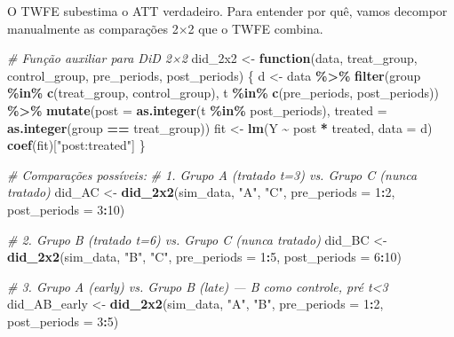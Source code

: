 \documentclass[
]{article}
\newenvironment{Shaded}{\begin{snugshade}}{\end{snugshade}}
\newcommand{\AttributeTok}[1]{\textcolor[rgb]{0.13,0.29,0.53}{#1}}
\newcommand{\CommentTok}[1]{\textcolor[rgb]{0.56,0.35,0.01}{\textit{#1}}}
\newcommand{\ControlFlowTok}[1]{\textcolor[rgb]{0.13,0.29,0.53}{\textbf{#1}}}
\newcommand{\DecValTok}[1]{\textcolor[rgb]{0.00,0.00,0.81}{#1}}
\newcommand{\FunctionTok}[1]{\textcolor[rgb]{0.13,0.29,0.53}{\textbf{#1}}}
\newcommand{\NormalTok}[1]{#1}
\newcommand{\OtherTok}[1]{\textcolor[rgb]{0.56,0.35,0.01}{#1}}
\newcommand{\SpecialCharTok}[1]{\textcolor[rgb]{0.81,0.36,0.00}{\textbf{#1}}}
\newcommand{\StringTok}[1]{\textcolor[rgb]{0.31,0.60,0.02}{#1}}
\begin{document}
O TWFE subestima o ATT verdadeiro. Para entender por quê, vamos decompor manualmente as comparações 2×2 que o TWFE combina.

\begin{Shaded}
\begin{Highlighting}[]
\CommentTok{\# Função auxiliar para DiD 2×2}
\NormalTok{did\_2x2 }\OtherTok{\textless{}{-}} \ControlFlowTok{function}\NormalTok{(data, treat\_group, control\_group, pre\_periods, post\_periods) \{}
\NormalTok{  d }\OtherTok{\textless{}{-}}\NormalTok{ data }\SpecialCharTok{\%\textgreater{}\%}
    \FunctionTok{filter}\NormalTok{(group }\SpecialCharTok{\%in\%} \FunctionTok{c}\NormalTok{(treat\_group, control\_group),}
\NormalTok{           t }\SpecialCharTok{\%in\%} \FunctionTok{c}\NormalTok{(pre\_periods, post\_periods)) }\SpecialCharTok{\%\textgreater{}\%}
    \FunctionTok{mutate}\NormalTok{(}\AttributeTok{post =} \FunctionTok{as.integer}\NormalTok{(t }\SpecialCharTok{\%in\%}\NormalTok{ post\_periods),}
           \AttributeTok{treated =} \FunctionTok{as.integer}\NormalTok{(group }\SpecialCharTok{==}\NormalTok{ treat\_group))}
\NormalTok{  fit }\OtherTok{\textless{}{-}} \FunctionTok{lm}\NormalTok{(Y }\SpecialCharTok{\textasciitilde{}}\NormalTok{ post }\SpecialCharTok{*}\NormalTok{ treated, }\AttributeTok{data =}\NormalTok{ d)}
  \FunctionTok{coef}\NormalTok{(fit)[}\StringTok{"post:treated"}\NormalTok{]}
\NormalTok{\}}

\CommentTok{\# Comparações possíveis:}
\CommentTok{\# 1. Grupo A (tratado t=3) vs. Grupo C (nunca tratado)}
\NormalTok{did\_AC }\OtherTok{\textless{}{-}} \FunctionTok{did\_2x2}\NormalTok{(sim\_data, }\StringTok{"A"}\NormalTok{, }\StringTok{"C"}\NormalTok{, }\AttributeTok{pre\_periods =} \DecValTok{1}\SpecialCharTok{:}\DecValTok{2}\NormalTok{, }\AttributeTok{post\_periods =} \DecValTok{3}\SpecialCharTok{:}\DecValTok{10}\NormalTok{)}

\CommentTok{\# 2. Grupo B (tratado t=6) vs. Grupo C (nunca tratado)}
\NormalTok{did\_BC }\OtherTok{\textless{}{-}} \FunctionTok{did\_2x2}\NormalTok{(sim\_data, }\StringTok{"B"}\NormalTok{, }\StringTok{"C"}\NormalTok{, }\AttributeTok{pre\_periods =} \DecValTok{1}\SpecialCharTok{:}\DecValTok{5}\NormalTok{, }\AttributeTok{post\_periods =} \DecValTok{6}\SpecialCharTok{:}\DecValTok{10}\NormalTok{)}

\CommentTok{\# 3. Grupo A (early) vs. Grupo B (late) — B como controle, pré t\textless{}3}
\NormalTok{did\_AB\_early }\OtherTok{\textless{}{-}} \FunctionTok{did\_2x2}\NormalTok{(sim\_data, }\StringTok{"A"}\NormalTok{, }\StringTok{"B"}\NormalTok{, }\AttributeTok{pre\_periods =} \DecValTok{1}\SpecialCharTok{:}\DecValTok{2}\NormalTok{, }\AttributeTok{post\_periods =} \DecValTok{3}\SpecialCharTok{:}\DecValTok{5}\NormalTok{)}


\end{Highlighting}
\end{Shaded}
\end{document}
